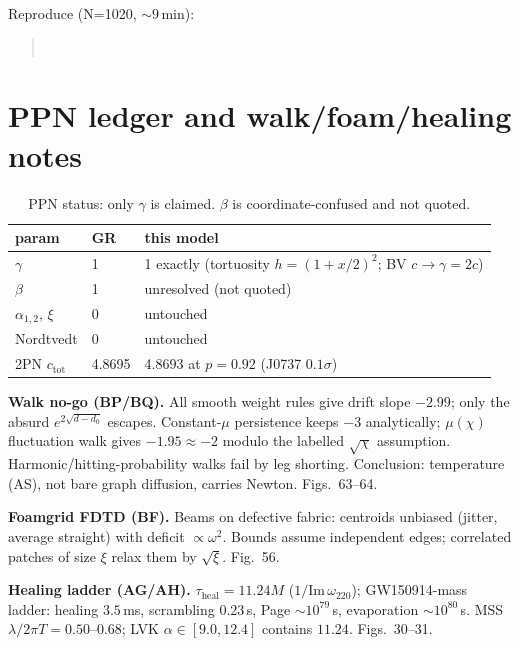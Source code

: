 \documentclass[11pt]{article}
\begin{document}
Reproduce (N=1020, $\sim 9$\,min):
\begin{quote}\small
{}\\
\end{quote}

\section{PPN ledger and walk/foam/healing notes}
\label{sec:ppn}

\begin{table}[ht]\centering\small
\caption{PPN status: only $\gamma$ is claimed. $\beta$ is coordinate-confused and not quoted.}
\label{tab:ppn}
\begin{tabular}{@{}l l p{9.5cm}@{}}\toprule
param & GR & this model \\\midrule
$\gamma$ & 1 & 1 exactly (tortuosity $h = (1+x/2)^2$; BV $c \to \gamma = 2c$) \\
$\beta$ & 1 & unresolved (not quoted) \\
$\alpha_{1,2}$, $\xi$ & 0 & untouched \\
Nordtvedt & 0 & untouched \\
2PN $c_{\mathrm{tot}}$ & 4.8695 & 4.8693 at $p = 0.92$ (J0737 $0.1\sigma$) \\\bottomrule
\end{tabular}
\end{table}

\textbf{Walk no-go (BP/BQ).} All smooth weight rules give drift slope $-2.99$;
only the absurd $e^{2\sqrt{d-d_0}}$ escapes. Constant-$\mu$ persistence keeps
$-3$ analytically; $\mu(\chi)$ fluctuation walk gives $-1.95 \approx -2$
modulo the labelled $\sqrt{\chi}$ assumption. Harmonic/hitting-probability
walks fail by leg shorting. Conclusion: temperature (AS), not bare graph
diffusion, carries Newton. Figs.~63--64.

\textbf{Foamgrid FDTD (BF).} Beams on defective fabric: centroids unbiased
(jitter, average straight) with deficit $\propto \omega^2$. Bounds assume
independent edges; correlated patches of size $\xi$ relax them by $\sqrt{\xi}$.
Fig.~56.

\textbf{Healing ladder (AG/AH).} $\tau_{\mathrm{heal}} = 11.24M$
($1/\mathrm{Im}\,\omega_{220}$); GW150914-mass ladder: healing $3.5$\,ms, scrambling $0.23$\,s,
Page $\sim 10^{79}$\,s, evaporation $\sim 10^{80}$\,s. MSS
$\lambda/2\pi T = 0.50$--$0.68$; LVK $\alpha \in [9.0,12.4]$ contains $11.24$.
Figs.~30--31.
\end{document}
